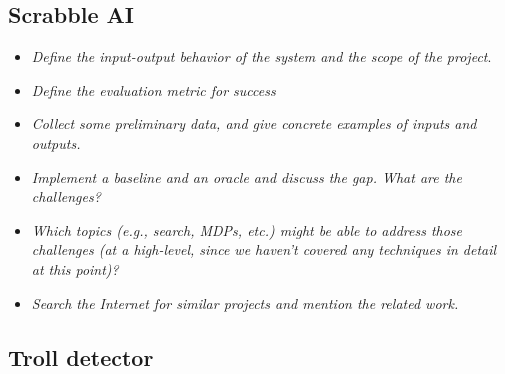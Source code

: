 \documentclass[12pt]{article}
\begin{document}
\subsection{Scrabble AI}
\begin{itemize}
  \item  \emph{Define the input-output behavior of the system and the scope of the project}.
  \item  \emph{Define the evaluation metric for success}
  \item  \emph{Collect some preliminary data, and give concrete examples of inputs and outputs.}
  \item  \emph{Implement a baseline and an oracle and discuss the gap. What are the challenges?}
  \item \emph{Which topics (e.g., search, MDPs, etc.) might be able to address those challenges (at a high-level, since we haven't covered any techniques in detail at this point)?}
  \item  \emph{Search the Internet for similar projects and mention the related work.}
\end{itemize}

\subsection{Troll detector}
\end{document}
